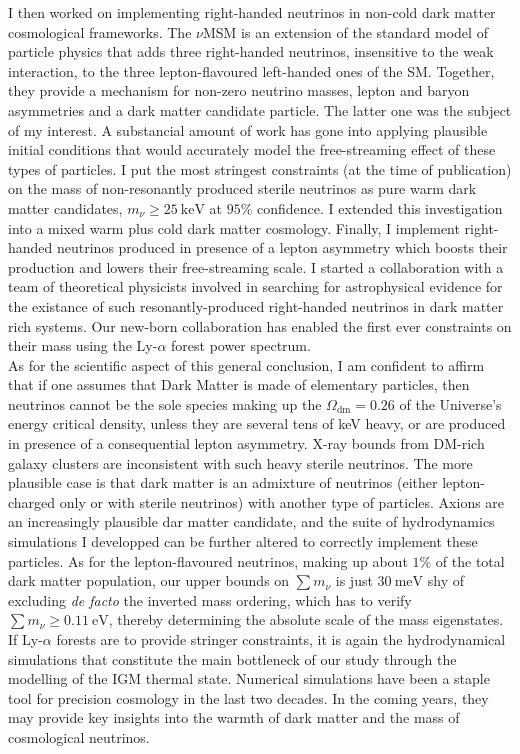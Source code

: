 \begin{intro}
I then worked on implementing right-handed neutrinos in non-cold dark matter cosmological frameworks. The $\nu$MSM is an extension of the standard model of particle physics that adds three right-handed neutrinos, insensitive to the weak interaction, to the three lepton-flavoured left-handed ones of the SM. Together, they provide a mechanism for non-zero neutrino masses, lepton and baryon asymmetries and a dark matter candidate particle. The latter one was the subject of my interest.  A substancial amount of work has gone into applying plausible initial conditions that would accurately model the free-streaming effect of these types of particles. I put the most stringest constraints (at the time of publication) on the mass of non-resonantly produced sterile neutrinos as pure warm dark matter candidates, $m_\nu \geq 25~\mathrm{keV}$ at $95\%$ confidence. I extended this investigation into a mixed warm plus cold dark matter cosmology. Finally, I implement right-handed neutrinos produced in presence of a lepton asymmetry which boosts their production and lowers their free-streaming scale. I started a collaboration with a team of theoretical physicists involved in searching for astrophysical evidence for the existance of such resonantly-produced right-handed neutrinos in dark matter rich systems. Our new-born collaboration has enabled the first ever constraints on their mass using the  Ly-$\alpha$ forest power spectrum. \\

As for the scientific aspect of this general conclusion, I am confident to affirm that if one assumes that Dark Matter is made of elementary particles, then neutrinos cannot be the sole species making up the $\Omega_\mathrm{dm}=0.26$ of the Universe's energy critical density, unless they are several tens of keV heavy, or are produced in presence of a consequential lepton asymmetry. X-ray bounds from DM-rich galaxy clusters are inconsistent with such heavy sterile neutrinos. The more plausible case is that dark matter is an admixture of neutrinos (either lepton-charged only or with sterile neutrinos) with another type of particles. Axions are an increasingly plausible dar matter candidate, and the suite of hydrodynamics simulations I developped can be further altered to correctly implement these particles. As for the lepton-flavoured neutrinos, making up about $1\%$ of the total dark matter population, our upper bounds on $\sum m_\nu$ is just $30~\mathrm{meV}$ shy of excluding \textit{de facto} the inverted mass ordering, which has to verify $\sum m_\nu \geqslant 0.11~\mathrm{eV}$, thereby determining the absolute scale of the mass eigenstates. If Ly-$\alpha$ forests are to provide stringer constraints, it is again the hydrodynamical simulations that constitute the main bottleneck of our study through the modelling of the IGM thermal state. Numerical simulations have been a staple tool for precision cosmology in the last two decades. In the coming years, they may provide key insights into the warmth of dark matter and the mass of cosmological neutrinos.
\end{intro}